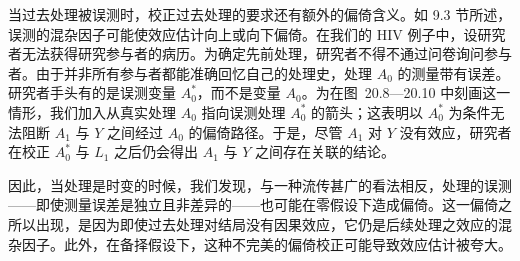 当过去处理被误测时，校正过去处理的要求还有额外的偏倚含义。如 9.3 节所述，误测的混杂因子可能使效应估计向上或向下偏倚。在我们的 HIV 例子中，设研究者无法获得研究参与者的病历。为确定先前处理，研究者不得不通过问卷询问参与者。由于并非所有参与者都能准确回忆自己的处理史，处理 $A_0$ 的测量带有误差。研究者手头有的是误测变量 $A_0^{*}$，而不是变量 $A_0$。为在图~20.8—20.10 中刻画这一情形，我们加入从真实处理 $A_0$ 指向误测处理 $A_0^{*}$ 的箭头；这表明以 $A_0^{*}$ 为条件无法阻断 $A_1$ 与 $Y$ 之间经过 $A_0$ 的偏倚路径。于是，尽管 $A_1$ 对 $Y$ 没有效应，研究者在校正 $A_0^{*}$ 与 $L_1$ 之后仍会得出 $A_1$ 与 $Y$ 之间存在关联的结论。

因此，当处理是时变的时候，我们发现，与一种流传甚广的看法相反，处理的误测——即使测量误差是独立且非差异的——也可能在零假设下造成偏倚。这一偏倚之所以出现，是因为即使过去处理对结局没有因果效应，它仍是后续处理之效应的混杂因子。此外，在备择假设下，这种不完美的偏倚校正可能导致效应估计被夸大。
